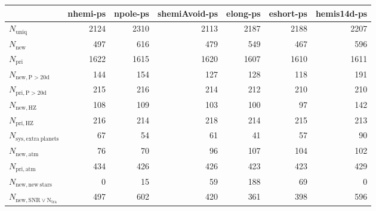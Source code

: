 \begin{tabular}{lrrrrrr}
\toprule
{} &  nhemi-ps &  npole-ps &  shemiAvoid-ps &  elong-ps &  eshort-ps &  hemis14d-ps \\
\midrule
$N_{\mathrm{uniq}}$                &      2124 &      2310 &           2113 &      2187 &       2188 &         2207 \\
$N_{\mathrm{new}}$                 &       497 &       616 &            479 &       549 &        467 &          596 \\
$N_{\mathrm{pri}}$                 &      1622 &      1615 &           1620 &      1607 &       1610 &         1611 \\
$N_{\mathrm{new,P>20d}}$           &       144 &       154 &            127 &       128 &        118 &          191 \\
$N_{\mathrm{pri,P>20d}}$           &       215 &       216 &            214 &       212 &        210 &          210 \\
$N_{\mathrm{new,HZ}}$              &       108 &       109 &            103 &       100 &         97 &          142 \\
$N_{\mathrm{pri,HZ}}$              &       216 &       214 &            218 &       214 &        215 &          213 \\
$N_{\mathrm{sys,extra\ planets}}$  &        67 &        54 &             61 &        41 &         57 &           90 \\
$N_{\mathrm{new,atm}}$             &        76 &        70 &             96 &       107 &        104 &          102 \\
$N_{\mathrm{pri,atm}}$             &       434 &       426 &            426 &       423 &        423 &          429 \\
$N_{\mathrm{new,new\ stars}}$      &         0 &        15 &             59 &       188 &         69 &            0 \\
$N_{\mathrm{new,SNR\lor N_{tra}}}$ &       497 &       602 &            420 &       361 &        398 &          596 \\
\bottomrule
\end{tabular}
